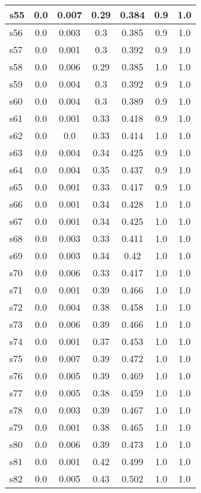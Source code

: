 \documentclass{article}
\begin{document}
\begin{tabular}{|l|c|c|c|c|c|c|}
\hline
s55 &0.0 & 0.007 & 0.29 & 0.384 & 0.9 & 1.0\\
\hline
s56 &0.0 & 0.003 & 0.3 & 0.385 & 0.9 & 1.0\\
\hline
s57 &0.0 & 0.001 & 0.3 & 0.392 & 0.9 & 1.0\\
\hline
s58 &0.0 & 0.006 & 0.29 & 0.385 & 1.0 & 1.0\\
\hline
s59 &0.0 & 0.004 & 0.3 & 0.392 & 0.9 & 1.0\\
\hline
s60 &0.0 & 0.004 & 0.3 & 0.389 & 0.9 & 1.0\\
\hline
s61 &0.0 & 0.001 & 0.33 & 0.418 & 0.9 & 1.0\\
\hline
s62 &0.0 & 0.0 & 0.33 & 0.414 & 1.0 & 1.0\\
\hline
s63 &0.0 & 0.004 & 0.34 & 0.425 & 0.9 & 1.0\\
\hline
s64 &0.0 & 0.004 & 0.35 & 0.437 & 0.9 & 1.0\\
\hline
s65 &0.0 & 0.001 & 0.33 & 0.417 & 0.9 & 1.0\\
\hline
s66 &0.0 & 0.001 & 0.34 & 0.428 & 1.0 & 1.0\\
\hline
s67 &0.0 & 0.001 & 0.34 & 0.425 & 1.0 & 1.0\\
\hline
s68 &0.0 & 0.003 & 0.33 & 0.411 & 1.0 & 1.0\\
\hline
s69 &0.0 & 0.003 & 0.34 & 0.42 & 1.0 & 1.0\\
\hline
s70 &0.0 & 0.006 & 0.33 & 0.417 & 1.0 & 1.0\\
\hline
s71 &0.0 & 0.001 & 0.39 & 0.466 & 1.0 & 1.0\\
\hline
s72 &0.0 & 0.004 & 0.38 & 0.458 & 1.0 & 1.0\\
\hline
s73 &0.0 & 0.006 & 0.39 & 0.466 & 1.0 & 1.0\\
\hline
s74 &0.0 & 0.001 & 0.37 & 0.453 & 1.0 & 1.0\\
\hline
s75 &0.0 & 0.007 & 0.39 & 0.472 & 1.0 & 1.0\\
\hline
s76 &0.0 & 0.005 & 0.39 & 0.469 & 1.0 & 1.0\\
\hline
s77 &0.0 & 0.005 & 0.38 & 0.459 & 1.0 & 1.0\\
\hline
s78 &0.0 & 0.003 & 0.39 & 0.467 & 1.0 & 1.0\\
\hline
s79 &0.0 & 0.001 & 0.38 & 0.465 & 1.0 & 1.0\\
\hline
s80 &0.0 & 0.006 & 0.39 & 0.473 & 1.0 & 1.0\\
\hline
s81 &0.0 & 0.001 & 0.42 & 0.499 & 1.0 & 1.0\\
\hline
s82 &0.0 & 0.005 & 0.43 & 0.502 & 1.0 & 1.0\\
\hline

\end{tabular}
\end{document}
